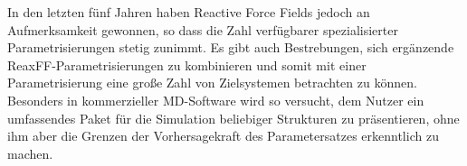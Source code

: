 In den letzten fünf Jahren haben Reactive Force Fields jedoch an Aufmerksamkeit gewonnen, so dass die Zahl verfügbarer spezialisierter Parametrisierungen stetig zunimmt.
Es gibt auch Bestrebungen, sich ergänzende ReaxFF-Parametrisierungen zu kombinieren und somit mit einer Parametrisierung eine große Zahl von Zielsystemen betrachten zu können.
Besonders in kommerzieller MD-Software\cite{biovia_materials_2014} wird so versucht, dem Nutzer ein umfassendes Paket für die Simulation beliebiger Strukturen zu präsentieren, ohne ihm aber die Grenzen der Vorhersagekraft des Parametersatzes erkenntlich zu machen.
